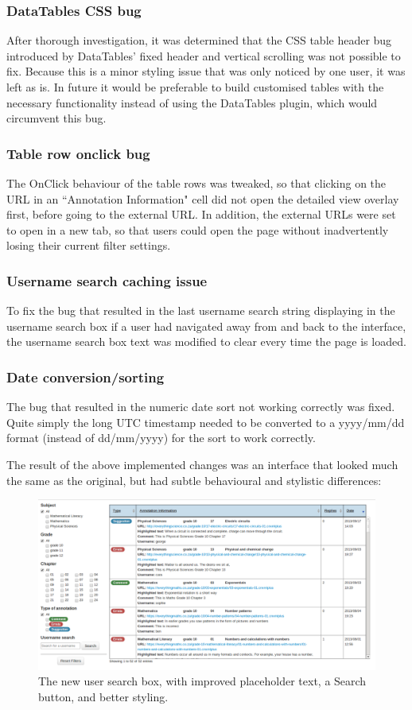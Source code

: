 \subsubsection{DataTables CSS bug}
After thorough investigation, it was determined that the CSS table header bug introduced by DataTables' fixed header and vertical scrolling was not possible to fix. Because this is a minor styling issue that was only noticed by one user, it was left as is. In future it would be preferable to build customised tables with the necessary functionality instead of using the DataTables plugin, which would circumvent this bug.

\subsubsection{Table row onclick bug}
The OnClick behaviour of the table rows was tweaked, so that clicking on the URL in an ``Annotation Information" cell did not open the detailed view overlay first, before going to the external URL. In addition, the external URLs were set to open in a new tab, so that users could open the page without inadvertently losing their current filter settings. 

\subsubsection{Username search caching issue}
To fix the bug that resulted in the last username search string displaying in the username search box if a user had navigated away from and back to the interface, the username search box text was modified to clear every time the page is loaded. 

\subsubsection{Date conversion/sorting}
The bug that resulted in the numeric date sort not working correctly was fixed. Quite simply the long UTC timestamp needed to be converted to a yyyy/mm/dd format (instead of dd/mm/yyyy) for the sort to work correctly. 

The result of the above implemented changes was an interface that looked much the same as the original, but had subtle behavioural and stylistic differences: 
\begin{figure}[h!]
    \centering
    \includegraphics[width=\textwidth]{Figures/V2/wholeUI.png}
 \caption{The new user search box, with improved placeholder text, a Search button, and better styling.}
\end{figure}

